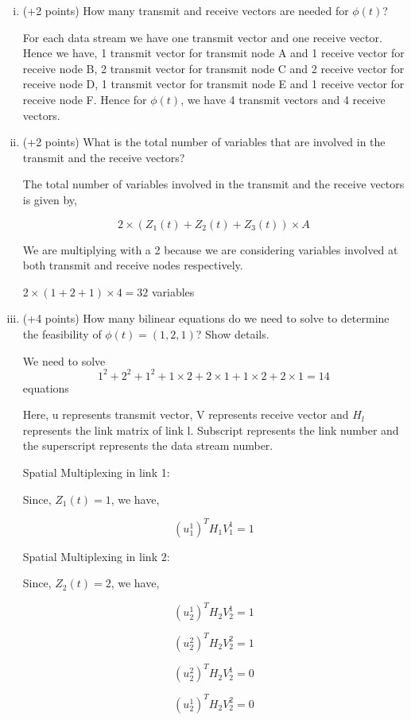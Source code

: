\documentclass[a4paper,oneside,12pt]{report}
\begin{document}
\begin{enumerate} [(i)]

\item	(+2 points) How many transmit and receive vectors are needed for $\phi(t)$?

For each data stream we have one transmit vector and one receive vector. Hence we have,
1 transmit vector for transmit node A and 1 receive vector for receive node B,
2 transmit vector for transmit node C and 2 receive vector for receive node D,
1 transmit vector for transmit node E and 1 receive vector for receive node F.
Hence for $\phi(t)$, we have 4 transmit vectors and 4 receive vectors.

\item	(+2 points) What is the total number of variables that are involved in the transmit and the receive vectors?

The total number of variables involved in the transmit and the receive vectors is given by,

$$2 \times (Z_1(t) + Z_2(t) + Z_3(t)) \times A$$

We are multiplying with a 2 because we are considering variables involved at both transmit and receive nodes respectively.

$2 \times (1 + 2 + 1) \times 4 = 32$ variables

\item	(+4 points) How many bilinear equations do we need to solve to determine the feasibility of $\phi(t)=(1,2,1)$? Show details.

We need to solve $$1^2 + 2^2 + 1^2 + 1 \times 2 + 2 \times 1 + 1 \times 2 + 2 \times 1 = 14$$ equations

Here, u represents transmit vector, V represents receive vector and $H_l$ represents the link matrix of link l. Subscript represents the link number and the superscript represents the data stream number.

Spatial Multiplexing in link 1:

Since, $Z_1(t) = 1$, we have,

$$(u^1_1)^T H_1 V^1_1 = 1$$

Spatial Multiplexing in link 2:

Since, $Z_2(t) = 2$, we have,

$$(u^1_2)^T H_2 V^1_2 = 1$$

$$(u^2_2)^T H_2 V^2_2 = 1$$

$$(u^2_2)^T H_2 V^1_2 = 0$$

$$(u^1_2)^T H_2 V^2_2 = 0$$


\end{enumerate}
\end{document}

